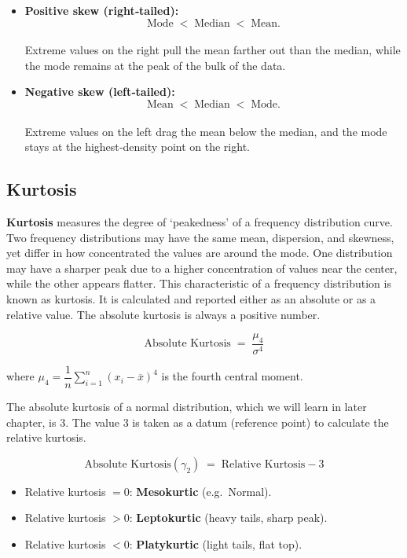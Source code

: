 \documentclass[twoside]{book}
\begin{document}
\begin{itemize}
  \item \textbf{Positive skew (right‐tailed):}
    \[
      \text{Mode} \;<\; \text{Median} \;<\; \text{Mean}.
    \]
    \\
    Extreme values on the right pull the mean farther out than the median, while the mode remains at the peak of the bulk of the data.

  \item \textbf{Negative skew (left‐tailed):}
    \[
      \text{Mean} \;<\; \text{Median} \;<\; \text{Mode}.
    \]
    \\
    Extreme values on the left drag the mean below the median, and the mode stays at the highest‐density point on the right.
\end{itemize}

\subsection{Kurtosis}

\textbf{Kurtosis} measures the degree of `peakedness' of a frequency distribution curve. Two frequency distributions may have the same mean, dispersion, and skewness, yet differ in how concentrated the values are around the mode. One distribution may have a sharper peak due to a higher concentration of values near the center, while the other appears flatter. This characteristic of a frequency distribution is known as kurtosis. It is calculated and reported either as an absolute or as a relative value. The absolute kurtosis is always a positive number.

\begin{textbox}
\[
\text{Absolute Kurtosis} \;=\;\frac{\mu_4}{\sigma^4}
\]
\end{textbox}
where \(\mu_4 = \dfrac{1}{n} \sum_{i=1}^n (x_i - \overline{x})^4\) is the fourth central moment.

The absolute kurtosis of a normal distribution, which we will learn in later chapter, is 3. The value 3 is taken as a datum (reference point) to calculate the relative kurtosis.
\begin{textbox}
\[
\text{Absolute Kurtosis}(\gamma_2) \;=\;\text{Relative Kurtosis} - 3
\]
\end{textbox}

\begin{itemize}
  \item Relative kurtosis \(=0\): \textbf{Mesokurtic} (e.g.\ Normal).
  \item Relative kurtosis \(>0\): \textbf{Leptokurtic} (heavy tails, sharp peak).
  \item Relative kurtosis \(<0\): \textbf{Platykurtic} (light tails, flat top).
\end{itemize}
\end{document}
